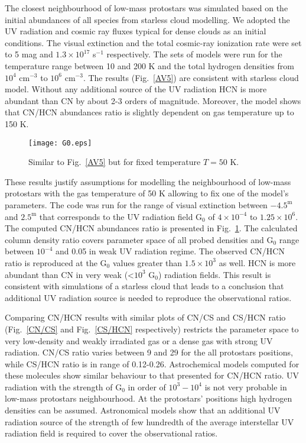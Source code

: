 \documentclass{aa}
\begin{document}
The closest neighbourhood of low-mass protostars was simulated based on the initial abundances of all species from starless cloud modelling. We adopted the UV radiation and cosmic ray fluxes typical for dense clouds as an initial conditions. The visual extinction and the total cosmic-ray ionization rate were set to 5 mag and $1.3\times 10^{17}$ s$^{-1}$ respectively. The sets of models were run for the temperature range between 10 and 200 K and the total hydrogen densities from $10^4$ cm$^{-3}$ to $10^6$ cm$^{-3}$. The results (Fig.~\ref{AV5}) are consistent with starless cloud model. Without any additional source of the UV radiation HCN is more abundant than CN by about 2-3 orders of magnitude. Moreover, the model shows that CN/HCN abundances ratio is slightly dependent on gas temperature up to 150 K. 

\begin{figure}
\centering
\texttt{[image: G0.eps]}
\caption{Similar to Fig.~\ref{AV5} but for fixed temperature $T = 50$ K.}
\label{G0}
\end{figure}

These results justify assumptions for modelling the neighbourhood of low-mass protostars with the gas temperature of 50 K allowing to fix one of the model’s parameters. The code was run for the range of visual extinction between $-4.5^{\mathrm{m}}$ and $2.5^{\mathrm{m}}$ that corresponds to the UV radiation field G$_0$ of $4\times 10^{-4}$ to $1.25\times 10^{6}$. The computed CN/HCN abundances ratio is presented in Fig.~\ref{G0}. The calculated column density ratio covers parameter space of all probed densities and G$_0$ range between $10^{-4}$ and 0.05 in weak UV radiation regime. The observed CN/HCN ratio is reproduced at the G$_0$ values greater than $1.5 \times 10^{3}$ as well. HCN is more abundant than CN in very weak (<$10^{3}$ G$_0$) radiation fields. This result is consistent with simulations of a starless cloud that leads to a conclusion that additional UV radiation source is needed to reproduce the observational ratios. 

Comparing CN/HCN results with similar plots of CN/CS and CS/HCN ratio (Fig.~\ref{CN/CS} and Fig.~\ref{CS/HCN} respectively) restricts the parameter space to very low-density and weakly irradiated gas or a dense gas with strong UV radiation. CN/CS ratio varies between 9 and 29 for the all protostars positions, while CS/HCN ratio is in range of 0.12-0.26. Astrochemical models computed for these molecules show similar behaviour to that presented for CN/HCN ratio. UV radiation with the strength of G$_0$ in order of $10^{3}-10^{4}$ is not very probable in low-mass protostars neighbourhood. At the protostars' positions high hydrogen densities can be assumed. Astronomical models show that an additional UV radiation source of the strength of few hundredth of the average interstellar UV radiation field is required to cover the observational ratios.
\end{document}
